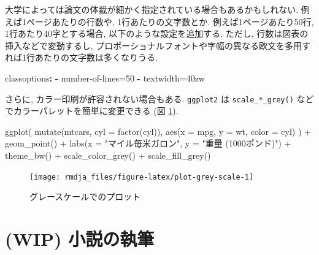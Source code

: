 \documentclass[
]{bxjsbook}
\newenvironment{Shaded}{\begin{snugshade}}{\end{snugshade}}
\newcommand{\AttributeTok}[1]{\textcolor[rgb]{0.77,0.63,0.00}{#1}}
\newcommand{\FunctionTok}[1]{\textcolor[rgb]{0.00,0.00,0.00}{#1}}
\newcommand{\KeywordTok}[1]{\textcolor[rgb]{0.13,0.29,0.53}{\textbf{#1}}}
\newcommand{\NormalTok}[1]{#1}
\newcommand{\SpecialCharTok}[1]{\textcolor[rgb]{0.00,0.00,0.00}{#1}}
\newcommand{\StringTok}[1]{\textcolor[rgb]{0.31,0.60,0.02}{#1}}
\theoremstyle{definition}
\theoremstyle{definition}
\theoremstyle{definition}
\theoremstyle{remark}
\begin{document}
大学によっては論文の体裁が細かく指定されている場合もあるかもしれない.
例えば1ページあたりの行数や, 1行あたりの文字数とか.
例えば1ページあたり50行, 1行あたり40字とする場合,
以下のような設定を追加する. ただし, 行数は図表の挿入などで変動するし,
プロポーショナルフォントや字幅の異なる欧文を多用すれば1行あたりの文字数は多くなりうる.

\begin{Shaded}
\begin{Highlighting}[]
\FunctionTok{classoptions}\KeywordTok{:}
\AttributeTok{  }\KeywordTok{{-}}\AttributeTok{ }\StringTok{\textquotesingle{}number{-}of{-}lines=50\textquotesingle{}}
\AttributeTok{  }\KeywordTok{{-}}\AttributeTok{ }\StringTok{\textquotesingle{}textwidth=40zw\textquotesingle{}}
\end{Highlighting}
\end{Shaded}

さらに, カラー印刷が許容されない場合もある. \texttt{ggplot2} は
\texttt{scale\_*\_grey()} などでカラーパレットを簡単に変更できる (図
\ref{fig:plot-grey-scale}).

\begin{Shaded}
\begin{Highlighting}[numbers=left,,]
\FunctionTok{ggplot}\NormalTok{(}
  \FunctionTok{mutate}\NormalTok{(mtcars, }\AttributeTok{cyl =} \FunctionTok{factor}\NormalTok{(cyl)),}
  \FunctionTok{aes}\NormalTok{(}\AttributeTok{x =}\NormalTok{ mpg, }\AttributeTok{y =}\NormalTok{ wt, }\AttributeTok{color =}\NormalTok{ cyl)}
\NormalTok{) }\SpecialCharTok{+}
  \FunctionTok{geom\_point}\NormalTok{() }\SpecialCharTok{+}
  \FunctionTok{labs}\NormalTok{(}\AttributeTok{x =} \StringTok{"マイル毎米ガロン"}\NormalTok{, }\AttributeTok{y =} \StringTok{"重量 (1000ポンド)"}\NormalTok{) }\SpecialCharTok{+}
  \FunctionTok{theme\_bw}\NormalTok{() }\SpecialCharTok{+}
  \FunctionTok{scale\_color\_grey}\NormalTok{() }\SpecialCharTok{+}
  \FunctionTok{scale\_fill\_grey}\NormalTok{()}
\end{Highlighting}
\end{Shaded}

\begin{figure}

{\centering \texttt{[image: rmdja\_files/figure-latex/plot-grey-scale-1]} 

}

\caption{グレースケールでのプロット}\label{fig:plot-grey-scale}
\end{figure}

\hypertarget{wip-ux5c0fux8aacux306eux57f7ux7b46}{%
\section{(WIP) 小説の執筆}\label{wip-ux5c0fux8aacux306eux57f7ux7b46}}
\end{document}
